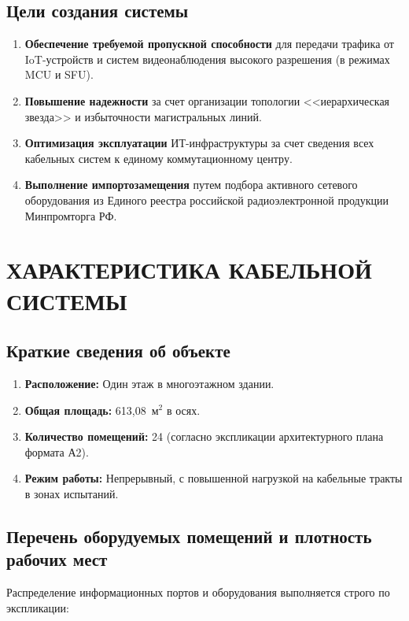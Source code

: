 \documentclass{bmstu}
\begin{document}
\begin{appendices}
\subsection{Цели создания системы}
\begin{enumerate}[label=\thesection.\arabic*]
    \item \textbf{Обеспечение требуемой пропускной способности} для передачи трафика от IoT-устройств и систем видеонаблюдения высокого разрешения (в режимах MCU и SFU).
    \item \textbf{Повышение надежности} за счет организации топологии <<иерархическая звезда>> и избыточности магистральных линий.
    \item \textbf{Оптимизация эксплуатации} ИТ-инфраструктуры за счет сведения всех кабельных систем к единому коммутационному центру.
    \item \textbf{Выполнение импортозамещения} путем подбора активного сетевого оборудования из Единого реестра российской радиоэлектронной продукции Минпромторга РФ.
\end{enumerate}


\section{ХАРАКТЕРИСТИКА КАБЕЛЬНОЙ СИСТЕМЫ}

\subsection{Краткие сведения об объекте}
\begin{enumerate}[label=\thesection.\arabic*]
    \item \textbf{Расположение:} Один этаж в многоэтажном здании.
    \item \textbf{Общая площадь:} 613,08~м$^2$ в осях.
    \item \textbf{Количество помещений:} 24 (согласно экспликации архитектурного плана формата А2).
    \item \textbf{Режим работы:} Непрерывный, с повышенной нагрузкой на кабельные тракты в зонах испытаний.
\end{enumerate}

\subsection{Перечень оборудуемых помещений и плотность рабочих мест}
Распределение информационных портов и оборудования выполняется строго по экспликации:


\end{appendices}
\end{document}
